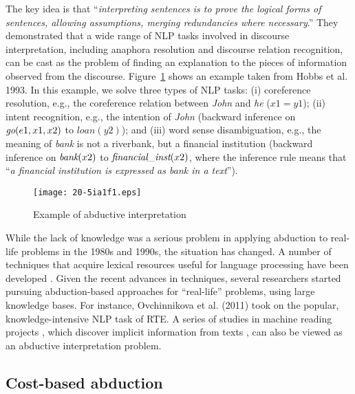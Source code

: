\documentclass[english]{jnlp_1.4}
\def\leader#1{}
\begin{document}
\leader{Hobbs et al. (1993)\nocite{Hobbs93} pioneered an
  abduction-based approach for natural language understanding.} The
key idea is that ``\emph{interpreting sentences is to prove the
  logical forms of sentences, allowing assumptions, merging
  redundancies where necessary}.'' They demonstrated that a wide range
of NLP tasks involved in discourse interpretation, including anaphora
resolution and discourse relation recognition, can be cast as the
problem of finding an explanation to the pieces of information
observed from the discourse. Figure~\ref{fig:ia} shows an example
taken from Hobbs et al. 1993\nocite{Hobbs93}. In this example, we solve three
types of NLP tasks: (i) coreference resolution, e.g., the coreference relation
between \emph{John} and \emph{he} ($x1=y1$); (ii) intent recognition,
e.g., the intention of \emph{John} (backward inference on
$\emph{go}(e1,x1,x2)$ to $loan(y2)$); and (iii) word sense
disambiguation, e.g., the meaning of \emph{bank} is not a riverbank,
but a financial institution (backward inference on $\emph{bank}(x2)$
to $\emph{financial\_inst}(x2)$, where the inference rule means that
``\emph{a financial institution is expressed as bank in a text}'').

\begin{figure}[b]
\begin{center}
\texttt{[image: 20-5ia1f1.eps]}
\end{center}
\caption{Example of abductive interpretation}
\label{fig:ia}
\end{figure}

While the lack of knowledge was a serious problem in applying
abduction to real-life problems in the 1980s and 1990s, the situation has
changed. A number of techniques that acquire lexical resources useful
for language processing have been developed
\cite[etc.]{fellbaum98,framenetII,Chambers09,Scho10}. Given the recent
advances in techniques, several researchers started pursuing
abduction-based approaches for ``real-life'' problems, using large
knowledge bases. For instance, Ovchinnikova et
al. (2011)\nocite{Ovch11} took on the popular, knowledge-intensive
NLP task of RTE. A series of
studies in machine reading projects \cite{Etzioni06}, which discover
implicit information from texts \cite{Penas10,Hovy11}, can also
be viewed as an abductive interpretation problem. 


\subsection{Cost-based abduction}
\label{sec:cba}
\end{document}
